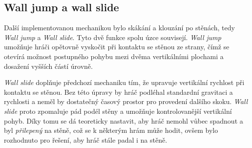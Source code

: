 \subsection{Wall jump a wall slide}

Další implementovanou mechanikou bylo skákání a klouzání po stěnách, tedy \textit{Wall jump} a \textit{Wall slide}. Tyto dvě funkce spolu úzce souvisejí. \textit{Wall jump} umožňuje hráči opětovně vyskočit při kontaktu se stěnou ze strany, čímž se otevírá možnost postupného pohybu mezi dvěma vertikálními plochami a dosažení vyšších částí úrovně.

\textit{Wall slide} doplňuje předchozí mechaniku tím, že upravuje vertikální rychlost při kontaktu se stěnou. Bez této úpravy by hráč podléhal standardní gravitaci a rychlosti a neměl by dostatečný časový prostor pro provedení dalšího skoku. \textit{Wall slide} proto zpomaluje pád podél stěny a umožňuje kontrolovanější vertikální pohyb. Díky tomu se dá teoreticky nastavit, aby hráč nemohl vůbec spadnout a byl \textit{přilepený} na stěně, což se k některým hrám může hodit, ovšem bylo rozhodnuto pro řešení, aby hráč stále padal i na stěně.